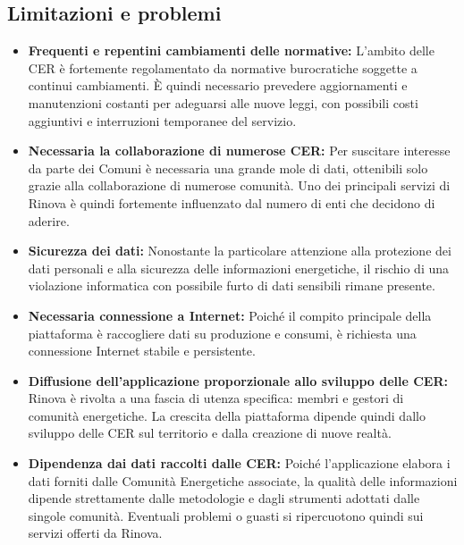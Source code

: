\subsection{Limitazioni e problemi}
\begin{itemize}
    \item \textbf{Frequenti e repentini cambiamenti delle normative:}  
    L’ambito delle CER è fortemente regolamentato da normative burocratiche soggette a continui cambiamenti. È quindi necessario prevedere aggiornamenti e manutenzioni costanti per adeguarsi alle nuove leggi, con possibili costi aggiuntivi e interruzioni temporanee del servizio.
    
    \item \textbf{Necessaria la collaborazione di numerose CER:}  
    Per suscitare interesse da parte dei Comuni è necessaria una grande mole di dati, ottenibili solo grazie alla collaborazione di numerose comunità. Uno dei principali servizi di Rinova è quindi fortemente influenzato dal numero di enti che decidono di aderire.
    
    \item \textbf{Sicurezza dei dati:}  
    Nonostante la particolare attenzione alla protezione dei dati personali e alla sicurezza delle informazioni energetiche, il rischio di una violazione informatica con possibile furto di dati sensibili rimane presente.
    
    \item \textbf{Necessaria connessione a Internet:}  
    Poiché il compito principale della piattaforma è raccogliere dati su produzione e consumi, è richiesta una connessione Internet stabile e persistente.
    
    \item \textbf{Diffusione dell’applicazione proporzionale allo sviluppo delle CER:}  
    Rinova è rivolta a una fascia di utenza specifica: membri e gestori di comunità energetiche. La crescita della piattaforma dipende quindi dallo sviluppo delle CER sul territorio e dalla creazione di nuove realtà.
    
    \item \textbf{Dipendenza dai dati raccolti dalle CER:}  
    Poiché l’applicazione elabora i dati forniti dalle Comunità Energetiche associate, la qualità delle informazioni dipende strettamente dalle metodologie e dagli strumenti adottati dalle singole comunità. Eventuali problemi o guasti si ripercuotono quindi sui servizi offerti da Rinova.
\end{itemize}
